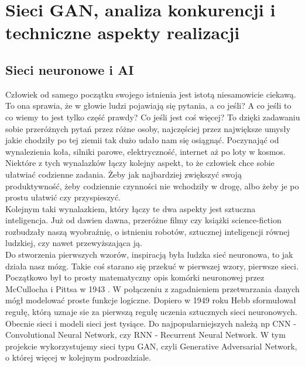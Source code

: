 \documentclass[12pt]{article}
\begin{document}
\begin{sloppypar}
\section{Sieci GAN, analiza konkurencji i techniczne aspekty realizacji}
{
  \subsection{Sieci neuronowe i AI}
  {
    Człowiek od samego początku swojego istnienia jest istotą niesamowicie ciekawą. 
    To ona sprawia, że w głowie ludzi pojawiają się pytania, a co jeśli? 
    A co jeśli to co wiemy to jest tylko część prawdy? Co jeśli jest coś więcej?
    To dzięki zadawaniu sobie przeróżnych pytań przez różne osoby, najczęściej przez największe umysły jakie chodziły po tej ziemii tak dużo udało nam się osiągnąć.
    Poczynająć od wynalezienia koła, silniki parowe, elektryczność, internet aż po loty w kosmos. 
    Niektóre z tych wynalazków łączy kolejny aspekt, to że człowiek chce sobie ułatwiać codzienne zadania. 
    Żeby jak najbardziej zwiększyć swoją produktywność, żeby codziennie czynności nie wchodziły w drogę, albo żeby je po prostu ułatwić czy przyspieszyć. \\
    Kolejnym taki wynalazkiem, który łączy te dwa aspekty jest sztuczna inteligencja. 
    Już od dawien dawna, przeróżne filmy czy książki science-fiction rozbudzały naszą wyobraźnię, o istnieniu robotów, sztucznej inteligencji równej ludzkiej, czy nawet przewyższająca ją. \\
    Do stworzenia pierwszych wzorów, inspiracją była ludzka sieć neuronowa, to jak działa nasz mózg. 
    Takie coś starano się przekuć w pierwszej wzory, pierwsze sieci. Początkowo był to prosty matematyczny opis komórki neuronowej przez McCullocha i Pittsa w 1943 \cite{sztuczna-inteligencja}.
    W połączeniu z zagadnieniem przetwarzania danych mógł modelować proste funkcje logiczne. 
    Dopiero w 1949 roku Hebb sformułował regułę, którą uznaje sie za pierwszą regułę uczenia sztucznych sieci neuronowych\cite{sztuczna-inteligencja}.\\
    Obecnie sieci i modeli sieci jest tysiące. Do najpopularniejszych należą np CNN - Convolutional Neural Network, czy RNN - Recurrent Neural Network.
    W tym projekcie wykorzystujemy sieci typu GAN, czyli Generative Adversarial Network, o której więcej w kolejnym podrozdziale.
  }
}
\end{sloppypar}
\end{document}
